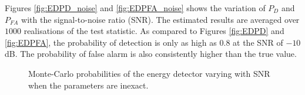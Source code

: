 \documentclass[11pt]{article}
\begin{document}
\noindent {}

Figures \ref{fig:EDPD_noise} and \ref{fig:EDPFA_noise} shows the variation of $P_{D}$ and $P_{FA}$ with the signal-to-noise ratio (SNR). The estimated results are averaged over $1000$ realisations of the test statistic. As compared to Figures \ref{fig:EDPD} and \ref{fig:EDPFA}, the probability of detection is only as high as $0.8$ at the SNR of $-10$dB. The probability of false alarm is also consistently higher than the true value.
\begin{figure}[t]
\centering
{}
\caption{Monte-Carlo probabilities of the energy detector varying with SNR when the parameters are inexact.}
\label{fig:ED_inexact}
\end{figure}
\end{document}
